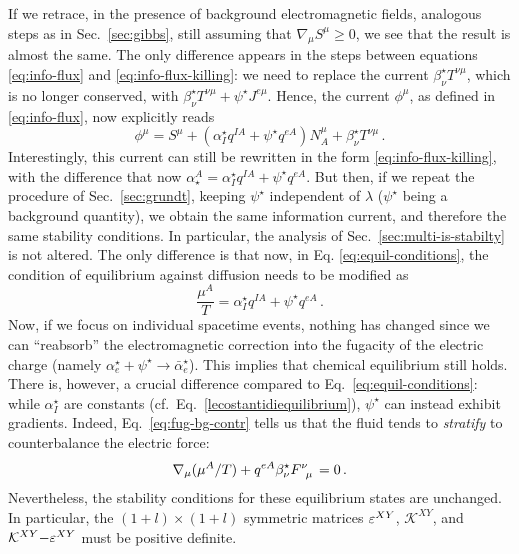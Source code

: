 \documentclass[
a4paper,
amsfonts,
amsmath,
reprint,
showkeys,
nofootinbib,
twoside,
onecolumn,
notitlepage
]{revtex4-1}
\begin{document}
	If we retrace, in the presence of background electromagnetic fields, analogous steps as in Sec.\ \ref{sec:gibbs}, still assuming that $\nabla_\mu S^\mu \geq 0$, we see that the result is almost the same. 
	The only difference appears in the steps between equations \eqref{eq:info-flux} and \eqref{eq:info-flux-killing}: we need to replace the current $\beta^\star_\nu T^{\nu \mu}$, which is no longer conserved, with $\beta^\star_\nu T^{\nu \mu} + \psi^\star J^{e\mu}$. 
	Hence, the current $\phi^\mu$, as defined in \eqref{eq:info-flux}, now explicitly reads
	\begin{equation}
		\phi^\mu =S^\mu +(\alpha^\star_I q^{IA}+\psi^\star q^{eA}) N^{\mu}_A + \beta^\star_\nu T^{\nu \mu} \, .
	\end{equation}
	Interestingly, this current can still be rewritten in the form \eqref{eq:info-flux-killing}, with the difference that now $\alpha^A_\star=\alpha^\star_I q^{IA}+\psi^\star q^{eA}$. 
	But then, if we repeat the procedure of Sec.\ \ref{sec:grundt}, keeping $\psi^\star$ independent of $\lambda$ ($\psi^\star$ being a background quantity), we obtain the same information current, and therefore the same stability conditions.
	In particular, the analysis of Sec.\ \ref{sec:multi-is-stabilty} is not altered. 
	The only difference is that now, in Eq. \eqref{eq:equil-conditions}, the condition of equilibrium against diffusion needs to be modified as
	\begin{equation}\label{eq:fug-bg-contr}
		\dfrac{\mu^A}{T} =\alpha^\star_I q^{IA}+\psi^\star q^{eA} \, .
	\end{equation}
	Now, if we focus on individual spacetime events, nothing has changed since we can ``reabsorb'' the electromagnetic correction into the fugacity of the electric charge (namely $\alpha^\star_e+\psi^\star \rightarrow \bar{\alpha}^\star_e$). 
	This implies that chemical equilibrium still holds. 
	There is, however, a crucial difference compared to Eq.\ \eqref{eq:equil-conditions}: while $\alpha^\star_I$ are constants (cf.\ Eq.\ \eqref{lecostantidiequilibrium}), $\psi^\star$ can instead exhibit gradients. 
	Indeed, Eq.\ \eqref{eq:fug-bg-contr} tells us that the fluid tends to \textit{stratify} to counterbalance the electric force:
	\begin{equation}
		\nabla_\mu (\mu^A/T) + q^{eA}\beta^\star_\nu F\indices{^\nu _\mu}=0 \, .
	\end{equation}
	Nevertheless, the stability conditions for these equilibrium states are unchanged. 
	In particular, the $(1{+}l)\times(1{+}l)$ symmetric matrices $\varepsilon^{XY}$, $\mathcal{K}^{XY}$, and $\mathcal{K}^{XY}{-}\varepsilon^{XY}$ must be positive definite.
	
\end{document}
